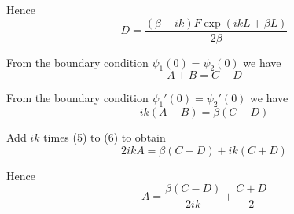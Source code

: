 Hence
\begin{equation*}
D=\frac{(\beta-ik)F\exp(ikL+\beta L)}{2\beta}
\tag{4}
\end{equation*}

From the boundary condition $\psi_1(0)=\psi_2(0)$ we have
\begin{equation*}
A+B=C+D
\tag{5}
\end{equation*}

From the boundary condition $\psi_1'(0)=\psi_2'(0)$ we have
\begin{equation*}
ik(A-B)=\beta(C-D)
\tag{6}
\end{equation*}

Add $ik$ times (5) to (6) to obtain
\begin{equation*}
2ikA=\beta(C-D)+ik(C+D)
\end{equation*}

Hence
\begin{equation*}
A=\frac{\beta(C-D)}{2ik}+\frac{C+D}{2}
\end{equation*}


